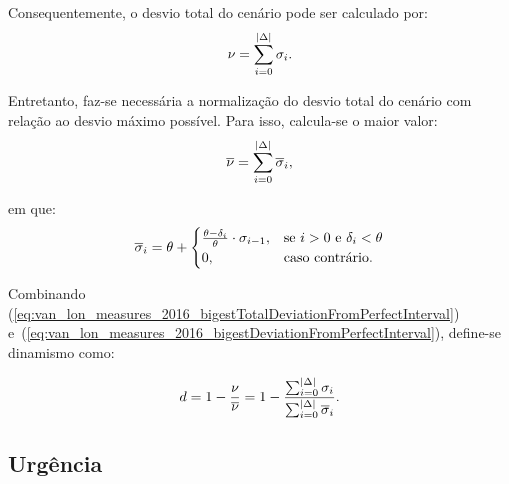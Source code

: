Consequentemente, o desvio total do cenário pode ser calculado por:
%
\begin{equation}
    \nu = 
    \sum_{i=0}^{|\Delta|} \sigma_i.
    \label{eq:van_lon_measures_2016_totalDeviationFromPerfectInterval}
\end{equation}

Entretanto, faz-se necessária a normalização do desvio total do cenário com
relação ao desvio máximo possível.
Para isso, calcula-se o maior valor:
%
\begin{equation}
    \overline{\nu} =
    \sum_{i=0}^{|\Delta|} 
		\overline{\sigma}_i,
    \label{eq:van_lon_measures_2016_bigestTotalDeviationFromPerfectInterval}
\end{equation}

\noindent em que:
%
\begin{equation}
    \overline{\sigma}_i = \theta + 
        \begin{cases}
            \frac{\theta - \delta_i}
								 {\theta} 
						\cdot \sigma_{i-1},
						& \text{se $i>0$ e $\delta_i 
                    < \theta$}\\
            0, & \text{caso contrário.}
        \end{cases}
    \label{eq:van_lon_measures_2016_bigestDeviationFromPerfectInterval}    
\end{equation}

Combinando  
(\ref{eq:van_lon_measures_2016_bigestTotalDeviationFromPerfectInterval})
e~(\ref{eq:van_lon_measures_2016_bigestDeviationFromPerfectInterval}), define-se 
dinamismo como:

\begin{equation}
      d = 1 - \frac{\nu}{\overline{\nu}} = 1 -
      \frac{\sum_{i=0}^{|\Delta|}
			\sigma_i}{\sum_{i=0}^{|\Delta|}
      \overline{\sigma}_i}.
      \label{eq:van_lon_measures_2016_dynamism}
\end{equation}







\subsection{Urgência}\label{sec:urgencia}

